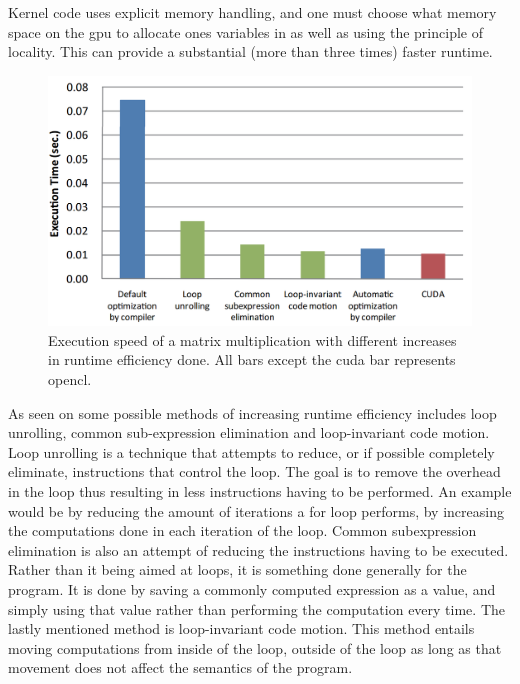 Kernel code uses explicit memory handling, and one must choose what memory space on the \acrshort{gpu} to allocate ones variables in as well as using the principle of locality.
This can provide a substantial (more than three times) faster runtime. \citep{ocl_lecture3}
\begin{figure}[h]
\centering	
 \includegraphics[width=1\textwidth]{figures/opencloptimisation.png} %
\caption{Execution speed of a matrix multiplication with different increases in runtime efficiency done. All bars except the \gls{cuda} bar represents \gls{opencl}. \citep{CUDAOpenCLOptimisation}}\label{image:OpenCLOptCompare}
\vspace{-15pt}
\end{figure}
As seen on  some possible methods of increasing runtime efficiency includes loop unrolling, common sub-expression elimination and loop-invariant code motion. 
Loop unrolling is a technique that attempts to reduce, or if possible completely eliminate, instructions that control the loop.
The goal is to remove the overhead in the loop thus resulting in less instructions having to be performed.
An example would be by reducing the amount of iterations a for loop performs, by increasing the computations done in each iteration of the loop.
Common subexpression elimination is also an attempt of reducing the instructions having to be executed.
Rather than it being aimed at loops, it is something done generally for the program.
It is done by saving a commonly computed expression as a value, and simply using that value rather than performing the computation every time.
The lastly mentioned method is loop-invariant code motion.
This method entails moving computations from inside of the loop, outside of the loop as long as that movement does not affect the semantics of the program.

